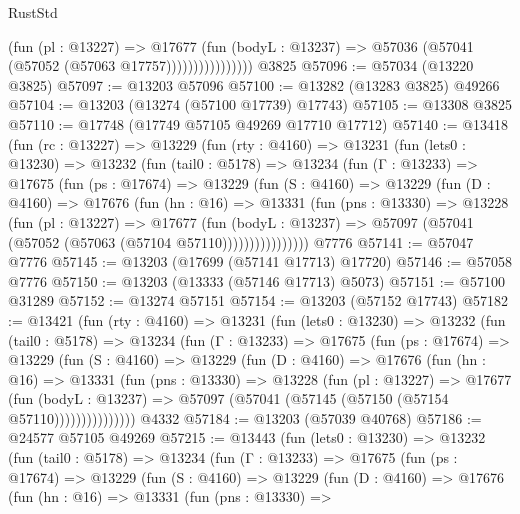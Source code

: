 \begin{lexlean}{RustStd}
\begin{coremodule}
                          (fun (pl : @13227) =>
                          @17677
                            (fun (bodyL : @13237) =>
                            @57036 (@57041 (@57052 (@57063 @17757))))))))))))))))
    @3825
@57096 := @57034 (@13220 @3825)
@57097 := @13203 @57096
@57100 := @13282 (@13283 @3825) @49266
@57104 := @13203 (@13274 (@57100 @17739) @17743)
@57105 := @13308 @3825
@57110 := @17748 (@17749 @57105 @49269 @17710 @17712)
@57140 := @13418
    (fun (rc : @13227) =>
    @13229
      (fun (rty : @4160) =>
      @13231
        (fun (lets0 : @13230) =>
        @13232
          (fun (tail0 : @5178) =>
          @13234
            (fun (Γ : @13233) =>
            @17675
              (fun (ps : @17674) =>
              @13229
                (fun (S : @4160) =>
                @13229
                  (fun (D : @4160) =>
                  @17676
                    (fun (hn : @16) =>
                    @13331
                      (fun (pns : @13330) =>
                      @13228
                        (fun (pl : @13227) =>
                        @17677
                          (fun (bodyL : @13237) =>
                          @57097 (@57041 (@57052 (@57063 (@57104 @57110))))))))))))))))
    @7776
@57141 := @57047 @7776
@57145 := @13203 (@17699 (@57141 @17713) @17720)
@57146 := @57058 @7776
@57150 := @13203 (@13333 (@57146 @17713) @5073)
@57151 := @57100 @31289
@57152 := @13274 @57151
@57154 := @13203 (@57152 @17743)
@57182 := @13421
    (fun (rty : @4160) =>
    @13231
      (fun (lets0 : @13230) =>
      @13232
        (fun (tail0 : @5178) =>
        @13234
          (fun (Γ : @13233) =>
          @17675
            (fun (ps : @17674) =>
            @13229
              (fun (S : @4160) =>
              @13229
                (fun (D : @4160) =>
                @17676
                  (fun (hn : @16) =>
                  @13331
                    (fun (pns : @13330) =>
                    @13228
                      (fun (pl : @13227) =>
                      @17677
                        (fun (bodyL : @13237) =>
                        @57097 (@57041 (@57145 (@57150 (@57154 @57110)))))))))))))))
    @4332
@57184 := @13203 (@57039 @40768)
@57186 := @24577 @57105 @49269
@57215 := @13443
    (fun (lets0 : @13230) =>
    @13232
      (fun (tail0 : @5178) =>
      @13234
        (fun (Γ : @13233) =>
        @17675
          (fun (ps : @17674) =>
          @13229
            (fun (S : @4160) =>
            @13229
              (fun (D : @4160) =>
              @17676
                (fun (hn : @16) =>
                @13331
                  (fun (pns : @13330) =>

\end{coremodule}
\end{lexlean}
